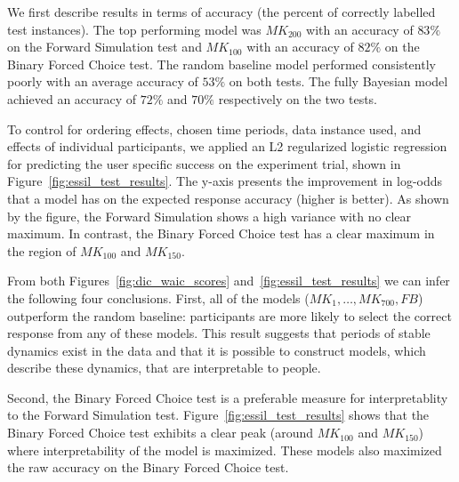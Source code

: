 \documentclass[letterpaper]{article} %
\begin{document}
We first describe results in terms of accuracy (the percent of correctly labelled test instances). 
The top performing model was $MK_{200}$ with an accuracy of $83\%$ on the Forward Simulation  test and $MK_{100}$  with an accuracy of $82\%$ on the Binary Forced Choice test. 
The random baseline model performed consistently poorly with an average accuracy of $53\%$ on both tests. 
The fully Bayesian model achieved an accuracy of $72\%$ and $70\%$ respectively on the two tests. 

To control for ordering effects, chosen time periods, data instance used, and effects of individual participants, we applied an L2 regularized logistic regression for predicting  the user specific success on the experiment trial, shown  in  Figure~\ref{fig:essil_test_results}. The y-axis presents the improvement in log-odds that a model has on the expected response accuracy (higher is better). 
As shown by the figure,  the Forward Simulation shows a high variance with no clear maximum. In contrast, the Binary Forced Choice test has a clear maximum in the region of $MK_{100}$ and $MK_{150}$.

From both Figures~\ref{fig:dic_waic_scores} and~\ref{fig:essil_test_results} we can infer the following four conclusions. 
First, all of the models ($MK_{1},\ldots,MK_{700}, FB$) outperform the random baseline: participants are more likely to select the correct response from any of these models. This result suggests that periods of stable dynamics  exist in the data and that it is possible to construct models, which describe these dynamics, that are interpretable to people. 

Second, the Binary Forced Choice test is a preferable measure for interpretablity   to the Forward Simulation test. Figure~\ref{fig:essil_test_results} shows that the Binary Forced Choice test exhibits a clear peak (around $MK_{100}$ and $MK_{150}$) where interpretability of the model is maximized. 
These models also maximized the  raw accuracy on the Binary Forced Choice test.
\end{document}

